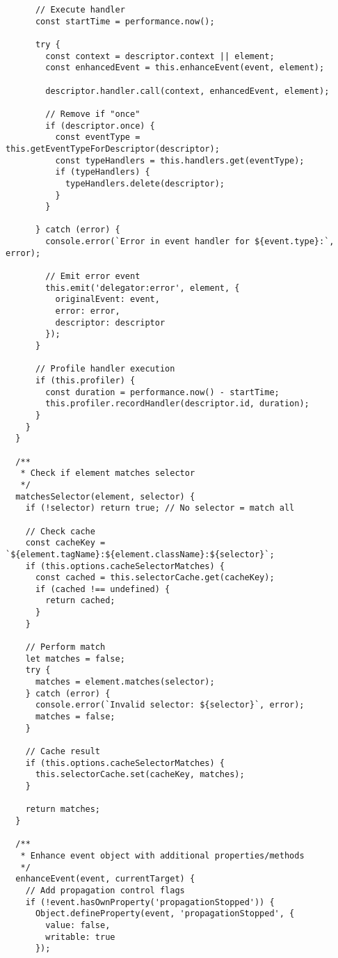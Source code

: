 \documentclass[11pt]{article}
\begin{document}
\begin{verbatim}
      // Execute handler
      const startTime = performance.now();
      
      try {
        const context = descriptor.context || element;
        const enhancedEvent = this.enhanceEvent(event, element);
        
        descriptor.handler.call(context, enhancedEvent, element);
        
        // Remove if "once"
        if (descriptor.once) {
          const eventType = this.getEventTypeForDescriptor(descriptor);
          const typeHandlers = this.handlers.get(eventType);
          if (typeHandlers) {
            typeHandlers.delete(descriptor);
          }
        }
        
      } catch (error) {
        console.error(`Error in event handler for ${event.type}:`, error);
        
        // Emit error event
        this.emit('delegator:error', element, {
          originalEvent: event,
          error: error,
          descriptor: descriptor
        });
      }
      
      // Profile handler execution
      if (this.profiler) {
        const duration = performance.now() - startTime;
        this.profiler.recordHandler(descriptor.id, duration);
      }
    }
  }
  
  /**
   * Check if element matches selector
   */
  matchesSelector(element, selector) {
    if (!selector) return true; // No selector = match all
    
    // Check cache
    const cacheKey = `${element.tagName}:${element.className}:${selector}`;
    if (this.options.cacheSelectorMatches) {
      const cached = this.selectorCache.get(cacheKey);
      if (cached !== undefined) {
        return cached;
      }
    }
    
    // Perform match
    let matches = false;
    try {
      matches = element.matches(selector);
    } catch (error) {
      console.error(`Invalid selector: ${selector}`, error);
      matches = false;
    }
    
    // Cache result
    if (this.options.cacheSelectorMatches) {
      this.selectorCache.set(cacheKey, matches);
    }
    
    return matches;
  }
  
  /**
   * Enhance event object with additional properties/methods
   */
  enhanceEvent(event, currentTarget) {
    // Add propagation control flags
    if (!event.hasOwnProperty('propagationStopped')) {
      Object.defineProperty(event, 'propagationStopped', {
        value: false,
        writable: true
      });
      

\end{verbatim}
\end{document}
